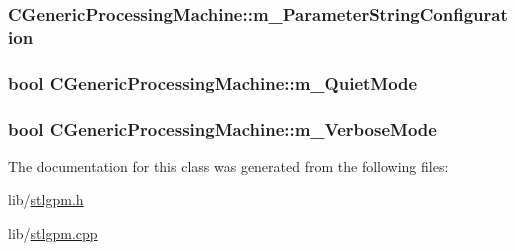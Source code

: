 \hypertarget{classCGenericProcessingMachine_a1f8069a91ee5ee1f418400ad1c902bba}{
\subsubsection[{m\-\_\-\-Parameter\-String\-Configuration}]{ C\-Generic\-Processing\-Machine\-::m\-\_\-\-Parameter\-String\-Configuration\hspace{0.3cm}{\ttfamily [protected]}}}\label{classCGenericProcessingMachine_a1f8069a91ee5ee1f418400ad1c902bba}
\hypertarget{classCGenericProcessingMachine_aa4f21388a42eec363818933f10b587c1}{
\subsubsection[{m\-\_\-\-Quiet\-Mode}]{\setlength{\rightskip}{0pt plus 5cm}bool C\-Generic\-Processing\-Machine\-::m\-\_\-\-Quiet\-Mode\hspace{0.3cm}{\ttfamily [protected]}}}\label{classCGenericProcessingMachine_aa4f21388a42eec363818933f10b587c1}
\hypertarget{classCGenericProcessingMachine_a81a35f50e9afa57d1d915bccc3276b1b}{
\subsubsection[{m\-\_\-\-Verbose\-Mode}]{\setlength{\rightskip}{0pt plus 5cm}bool C\-Generic\-Processing\-Machine\-::m\-\_\-\-Verbose\-Mode\hspace{0.3cm}{\ttfamily [protected]}}}\label{classCGenericProcessingMachine_a81a35f50e9afa57d1d915bccc3276b1b}


The documentation for this class was generated from the following files\-:\begin{DoxyCompactItemize}
\item 
lib/\hyperlink{stlgpm_8h}{stlgpm.\-h}\item 
lib/\hyperlink{stlgpm_8cpp}{stlgpm.\-cpp}\end{DoxyCompactItemize}
